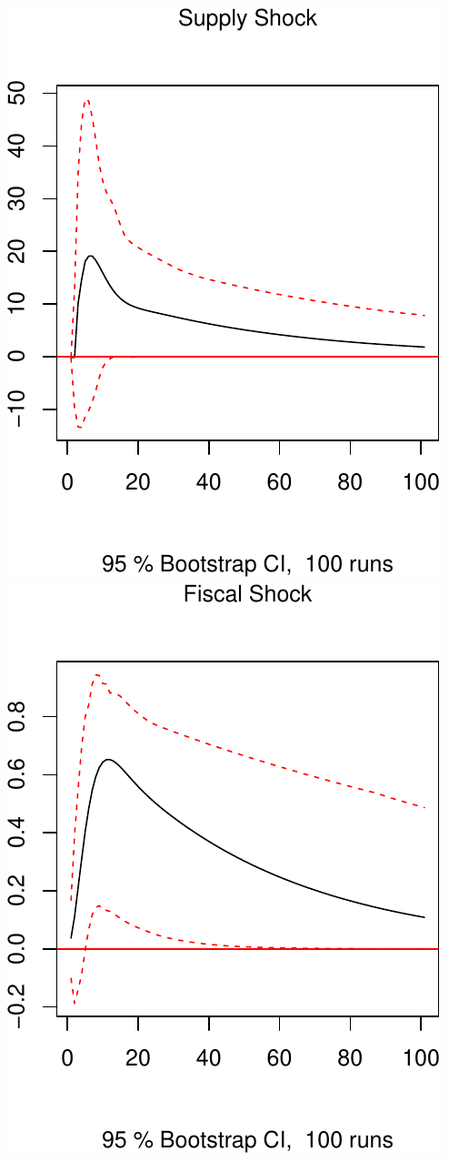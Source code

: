 \documentclass[11pt,preprint, authoryear]{elsarticle}
\numberwithin{equation}{section}
\numberwithin{figure}{section}
\numberwithin{table}{section}
\begin{document}
\includegraphics{TS_proj_files/figure-latex/unnamed-chunk-43-1.pdf}
\includegraphics{TS_proj_files/figure-latex/unnamed-chunk-43-2.pdf}
\end{document}
